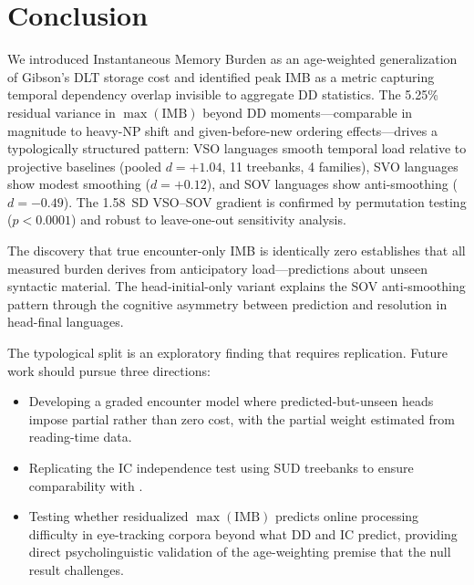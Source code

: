 \documentclass[11pt,letterpaper]{article}
\begin{document}
\section{Conclusion}
\label{sec:conclusion}

We introduced Instantaneous Memory Burden as an age-weighted generalization of Gibson's DLT storage cost and identified peak IMB as a metric capturing temporal dependency overlap invisible to aggregate DD statistics. The 5.25\% residual variance in $\max(\text{IMB})$ beyond DD moments---comparable in magnitude to heavy-NP shift and given-before-new ordering effects---drives a typologically structured pattern: VSO languages smooth temporal load relative to projective baselines (pooled $d = +1.04$, 11 treebanks, 4 families), SVO languages show modest smoothing ($d = +0.12$), and SOV languages show anti-smoothing ($d = -0.49$). The 1.58~SD VSO--SOV gradient is confirmed by permutation testing ($p < 0.0001$) and robust to leave-one-out sensitivity analysis.

The discovery that true encounter-only IMB is identically zero establishes that all measured burden derives from anticipatory load---predictions about unseen syntactic material. The head-initial-only variant explains the SOV anti-smoothing pattern through the cognitive asymmetry between prediction and resolution in head-final languages.

The typological split is an exploratory finding that requires replication. Future work should pursue three directions:

\begin{itemize}
  \item Developing a graded encounter model where predicted-but-unseen heads impose partial rather than zero cost, with the partial weight estimated from reading-time data.
  \item Replicating the IC independence test using SUD treebanks to ensure comparability with \citet{Yadav2022}.
  \item Testing whether residualized $\max(\text{IMB})$ predicts online processing difficulty in eye-tracking corpora beyond what DD and IC predict, providing direct psycholinguistic validation of the age-weighting premise that the \citet{Chen2005} null result challenges.
\end{itemize}



\end{document}
